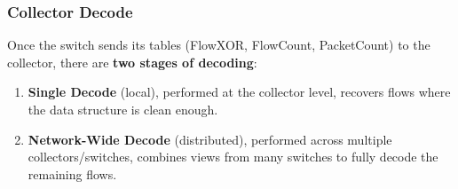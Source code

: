 \subsubsection{Collector Decode}

Once the switch sends its tables (FlowXOR, FlowCount, PacketCount) to the collector, there are \textbf{two stages of decoding}:
\begin{enumerate}
    \item \textbf{Single Decode} (local), performed at the collector level, recovers flows where the data structure is clean enough.
    \item \textbf{Network-Wide Decode} (distributed), performed across multiple collectors/switches, combines views from many switches to fully decode the remaining flows.
\end{enumerate}

